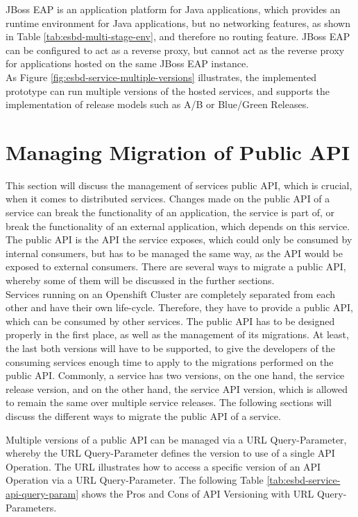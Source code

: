 JBoss EAP is an application platform for Java applications, which provides an runtime environment for Java applications, but no networking features, as shown in Table \vref{tab:esbd-multi-stage-env}, and therefore no routing feature. JBoss EAP can be configured to act as a reverse proxy, but cannot act as the reverse proxy for applications hosted on the same JBoss EAP instance. \\

As Figure \vref{fig:esbd-service-multiple-versions} illustrates, the implemented prototype can run multiple versions of the hosted services, and supports the implementation of release models such as A/B or Blue/Green Releases.

\section{Managing Migration of Public API}
\label{sec:esbd-multi-stage-env}
This section will discuss the management of services public API, which is crucial, when it comes to distributed services. Changes made on the public API of a service can break the functionality of an application, the service is part of, or break the functionality of an external application, which depends on this service. The public API is the API the service exposes, which could only be consumed by internal consumers, but has to be managed the same way, as the API would be exposed to external consumers. There are several ways to migrate a public API, whereby some of them will be discussed in the further sections. \\  

Services running on an Openshift Cluster are completely separated from each other and have their own life-cycle. Therefore, they have to provide a public API, which can be consumed by other services. The public API has to be designed properly in the first place, as well as the management of its migrations. At least, the last both versions will have to be supported, to give the developers of the consuming services enough time to apply to the migrations performed on the public API. Commonly, a service has two versions, on the one hand, the service release version, and on the other hand, the service API version, which is allowed to remain the same over multiple service releases. The following sections will discuss the different ways to migrate the public API of a service.

Multiple versions of a public API can be managed via a URL Query-Parameter, whereby the URL Query-Parameter defines the version to use of a single API Operation. The URL  illustrates how to access a specific version of an API Operation via a URL Query-Parameter. The following Table \vref{tab:esbd-service-api-query-param} shows the Pros and Cons of API Versioning with URL Query-Parameters.

